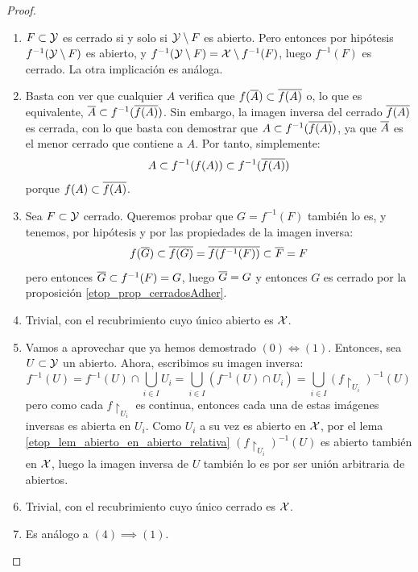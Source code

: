 \begin{prop}
\begin{proof}
\begin{enumerate}[align=left, leftmargin=*]
			\item[\fbox{$(1)\Longleftrightarrow (2)$}] $F\subset\mathcal{Y}$ es cerrado si y solo si $\mathcal{Y}\setminus F$ es abierto. Pero entonces por hipótesis $f^{-1}(\mathcal{Y}\setminus F)$ es abierto, y $f^{-1}(\mathcal{Y}\setminus F)=\mathcal{X}\setminus f^{-1}(F)$, luego $f^{-1}(F)$ es cerrado. La otra implicación es análoga.
			
			\item[\fbox{$(2)\implies (3)$}] Basta con ver que cualquier $A$ verifica que $f(\overline{A})\subset \overline{f(A)}$ o, lo que es equivalente, $\overline{A}\subset f^{-1}(\overline{f(A)})$. Sin embargo, la imagen inversa del cerrado $\overline{f(A)}$ es cerrada, con lo que basta con demostrar que $A\subset f^{-1}(\overline{f(A)})$, ya que $\overline{A}$ es el menor cerrado que contiene a $A$. Por tanto, simplemente:
			\[A\subset f^{-1}(f(A))\subset f^{-1}(\overline{f(A)})\]
			porque $f(A)\subset\overline{f(A)}$.
			
			\item[\fbox{$(3)\implies (2)$}] Sea $F\subset\mathcal{Y}$ cerrado. Queremos probar que $G=f^{-1}(F)$ también lo es, y tenemos, por hipótesis y por las propiedades de la imagen inversa:
			\[f(\overline{G})\subset\overline{f(G)}=\overline{f(f^{-1}(F))}\subset\overline{F}=F\]
			pero entonces $\overline{G}\subset f^{-1}(F)=G$, luego $\overline{G}=G$ y entonces $G$ es cerrado por la proposición \ref{etop_prop_cerradosAdher}.
						
			\item[\fbox{$(0)\implies (4)$}] Trivial, con el recubrimiento cuyo único abierto es $\mathcal{X}$.
			
			\item[\fbox{$(4)\implies (1)$}] Vamos a aprovechar que ya hemos demostrado $(0)\iff (1)$. Entonces, sea $U\subset \mathcal{Y}$ un abierto. Ahora, escribimos su imagen inversa:
			\[f^{-1}(U)=f^{-1}(U)\cap\bigcup\limits_{i\in I} U_i=\bigcup\limits_{i\in I} (f^{-1}(U)\cap U_i)=\bigcup\limits_{i\in I} (f\restriction_{U_i})^{-1}(U)\]
			pero como cada $f\restriction_{U_i}$ es continua, entonces cada una de estas imágenes inversas es abierta en $U_i$. Como $U_i$ a su vez es abierto en $\mathcal{X}$, por el lema \ref{etop_lem_abierto_en_abierto_relativa} $(f\restriction_{U_i})^{-1}(U)$ es abierto también en $\mathcal{X}$, luego la imagen inversa de $U$ también lo es por ser unión arbitraria de abiertos.
			
			\item[\fbox{$(0)\implies (5)$}] Trivial, con el recubrimiento cuyo único cerrado es $\mathcal{X}$.
			
			\item[\fbox{$(5)\implies (2)$}] Es análogo a $(4)\implies (1)$. \qedhere
		\end{enumerate}
	\end{proof}
\end{prop}

